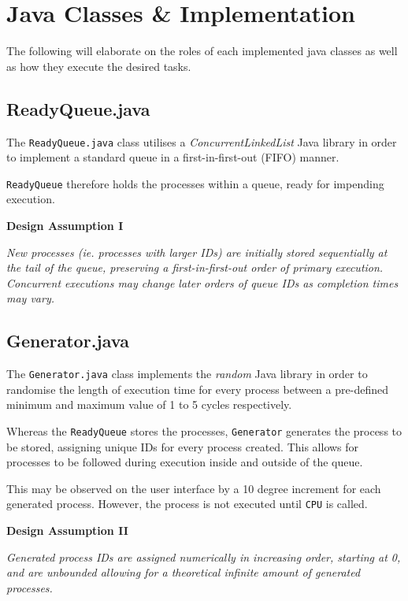\documentclass[]{report}
\begin{document}
\newpage 

\section*{Java Classes \& Implementation}
The following will elaborate on the roles of each implemented java classes as well as how they execute the desired tasks. 
	
\subsection*{ReadyQueue.java}
The \verb|ReadyQueue.java| class utilises a \textit{ConcurrentLinkedList} Java library in order to implement a standard queue in a first-in-first-out (FIFO) manner. \par 
\verb|ReadyQueue| therefore holds the processes within a queue, ready for impending execution.

\begin{mdframed}[backgroundcolor=lightgray!40]
	\textbf{Design Assumption I} \par 
	\textit{New processes (ie. processes with larger IDs) are initially stored sequentially at the tail of the queue, preserving a first-in-first-out order of primary execution. Concurrent executions may change later orders of queue IDs as completion times may vary.}
\end{mdframed}

\vspace{2mm}

\subsection*{Generator.java}
The \verb|Generator.java| class implements the \textit{random} Java library in order to randomise the length of execution time for every process between a pre-defined minimum and maximum value of 1 to 5 cycles respectively. \par 
Whereas the \verb|ReadyQueue| stores the processes, \verb|Generator| generates the process to be stored, assigning unique IDs for every process created. This allows for processes to be followed during execution inside and outside of the queue. \par 
This may be observed on the user interface by a 10 degree increment for each generated process. However, the process is not executed until \verb|CPU| is called.


\begin{mdframed}[backgroundcolor=lightgray!40]
	\textbf{Design Assumption II} \par 
	\textit{Generated process IDs are assigned numerically in increasing order, starting at 0, and are unbounded allowing for a theoretical infinite amount of generated processes.}
\end{mdframed}
\end{document}
